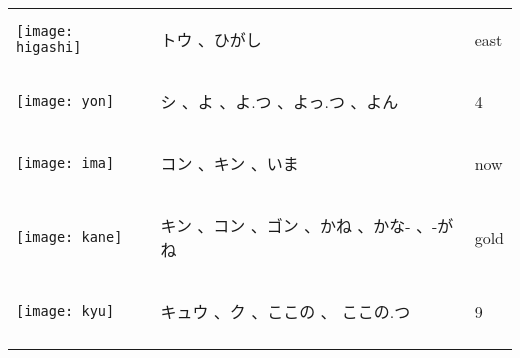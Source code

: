 \documentclass[a4paper,12pt]{extarticle}
\begin{document}
\begin{longtable}{|lp{6cm}p{4cm}|}
\begin{minipage}{0.3\textwidth}
\centerline{
	\texttt{[image: higashi]}
}
\end{minipage}
&
\begin{CJK}{UTF8}{min} トウ 、ひがし\end{CJK}
&
 east
\\ 
\begin{minipage}{0.3\textwidth}
\centerline{
	\texttt{[image: yon]}
}
\end{minipage}
&
\begin{CJK}{UTF8}{min} シ 、よ 、よ.つ 、よっ.つ 、よん\end{CJK}
&
 4
\\ 
\begin{minipage}{0.3\textwidth}
\centerline{
	\texttt{[image: ima]}
}
\end{minipage}
&
\begin{CJK}{UTF8}{min} コン 、キン 、いま\end{CJK}
&
 now
\\ 
\begin{minipage}{0.3\textwidth}
\centerline{
	\texttt{[image: kane]}
}
\end{minipage}
&
\begin{CJK}{UTF8}{min} キン 、コン 、ゴン  、かね 、かな- 、-がね\end{CJK}
&
 gold
\\ 
\begin{minipage}{0.3\textwidth}
\centerline{
	\texttt{[image: kyu]}
}
\end{minipage}
&
\begin{CJK}{UTF8}{min} キュウ 、ク 、ここの 、 ここの.つ\end{CJK}
&
 9
\\ 
\begin{minipage}{0.3\textwidth}

\end{minipage}
\end{longtable}
\end{document}
